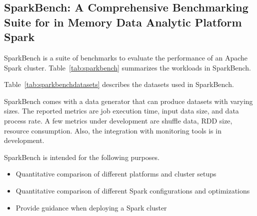 \subsection{SparkBench: A Comprehensive Benchmarking Suite for in Memory Data Analytic Platform Spark}
SparkBench is a suite of benchmarks to evaluate the performance of an Apache Spark cluster. Table~\ref{tab:sparkbench} summarizes the workloads in SparkBench.


Table~\ref{tab:sparkbenchdatasets} describes the datasets used in SparkBench. 


SparkBench comes with a data generator that can produce datasets with varying sizes. The reported metrics are job execution time, input data size, and data process rate. A few metrics under development are shuffle data, RDD size, resource consumption. Also, the integration with monitoring tools is in development.

SparkBench is intended for the following purposes.
\begin{itemize}
\item Quantitative comparison of different platforms and cluster setups
\item Quantitative comparison of different Spark configurations and optimizations
\item Provide guidance when deploying a Spark cluster
\end{itemize}

